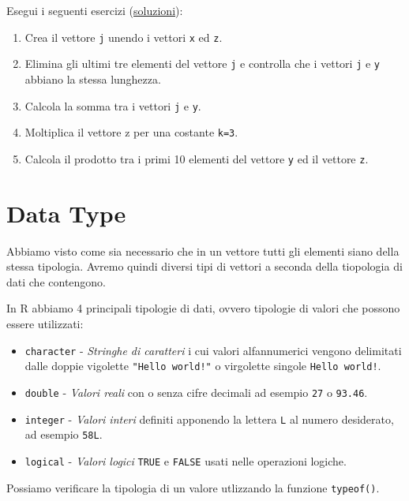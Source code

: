 \documentclass[
]{book}
\providecommand{\tightlist}{%
  \setlength{\itemsep}{0pt}\setlength{\parskip}{0pt}}
\begin{document}
Esegui i seguenti esercizi (\href{https://github.com/psicostat/Introduction2R/blob/master/exercises/chapter-07-vectors.R}{soluzioni}):

\begin{enumerate}
\def\labelenumi{\arabic{enumi}.}
\tightlist
\item
  Crea il vettore \texttt{j} unendo i vettori \texttt{x} ed \texttt{z}.
\item
  Elimina gli ultimi tre elementi del vettore \texttt{j} e controlla che i vettori \texttt{j} e \texttt{y} abbiano la stessa lunghezza.
\item
  Calcola la somma tra i vettori \texttt{j} e \texttt{y}.
\item
  Moltiplica il vettore z per una costante \texttt{k=3}.
\item
  Calcola il prodotto tra i primi 10 elementi del vettore \texttt{y} ed il vettore \texttt{z}.
\end{enumerate}

\hypertarget{data-type}{%
\section{Data Type}\label{data-type}}

Abbiamo visto come sia necessario che in un vettore tutti gli elementi siano della stessa tipologia. Avremo quindi diversi tipi di vettori a seconda della tiopologia di dati che contengono.

In R abbiamo 4 principali tipologie di dati, ovvero tipologie di valori che possono essere utilizzati:

\begin{itemize}
\tightlist
\item
  \texttt{character} - \emph{Stringhe di caratteri} i cui valori alfannumerici vengono delimitati dalle doppie vigolette \texttt{"Hello\ world!"} o virgolette singole \texttt{\textquotesingle{}Hello\ world!\textquotesingle{}}.
\item
  \texttt{double} - \emph{Valori reali} con o senza cifre decimali ad esempio \texttt{27} o \texttt{93.46}.
\item
  \texttt{integer} - \emph{Valori interi} definiti apponendo la lettera \texttt{L} al numero desiderato, ad esempio \texttt{58L}.
\item
  \texttt{logical} - \emph{Valori logici} \texttt{TRUE} e \texttt{FALSE} usati nelle operazioni logiche.
\end{itemize}

Possiamo verificare la tipologia di un valore utlizzando la funzione \texttt{typeof()}.
\end{document}
